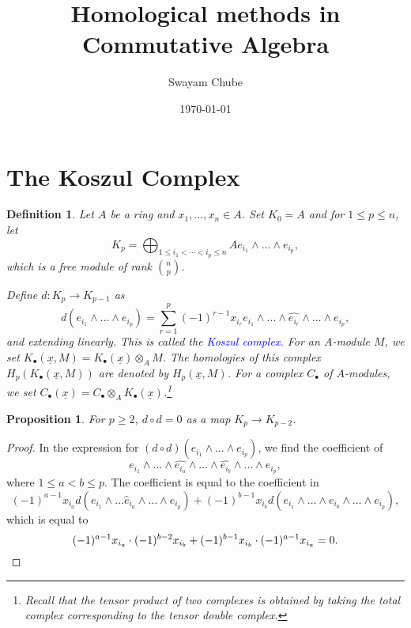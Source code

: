 \documentclass[12pt]{article}
\title{Homological methods in Commutative Algebra}
\author{Swayam Chube}
\date{\today}
\theoremstyle{thmstyle}
\newtheorem{proposition}[theorem]{Proposition}
\theoremstyle{defstyle}
\newtheorem{definition}[theorem]{Definition}
\newcommand{\wh}[1]{\widehat{#1}}
\newcommand{\define}[1]{\textcolor{blue}{\textit{#1}}}
\renewcommand{\le}{\leqslant}
\renewcommand{\ge}{\geqslant}
\begin{document}
\maketitle

\section{The Koszul Complex}

\begin{definition}
    Let $A$ be a ring and $x_1,\dots,x_n\in A$. Set $K_0 = A$ and for $1\le p\le n$, let 
    \begin{equation*}
        K_p = \bigoplus_{1\le i_1 < \cdots < i_p\le n} A e_{i_1}\wedge\dots\wedge e_{i_p},
    \end{equation*}
    which is a free module of rank $\binom{n}{p}$.

    Define $d: K_p\to K_{p - 1}$ as 
    \begin{equation*}
        d\left(e_{i_1}\wedge\dots\wedge e_{i_p}\right) = \sum_{r = 1}^p (-1)^{r - 1} x_{i_r} e_{i_1}\wedge\dots\wedge\wh{e_{i_r}}\wedge\dots\wedge e_{i_p},
    \end{equation*}
    and extending linearly. This is called the \define{Koszul complex}.  For an $A$-module $M$, we set $K_\bullet(\underline x, M) = K_\bullet(\underline x)\otimes_A M$. The homologies of this complex $H_p\left(K_\bullet(\underline x, M)\right)$ are denoted by $H_p(\underline x, M)$. For a complex $C_\bullet$ of $A$-modules, we set $C_\bullet(\underline x) = C_\bullet\otimes_A K_\bullet(\underline x)$.\footnote{Recall that the tensor product of two complexes is obtained by taking the total complex corresponding to the tensor double complex.} 
\end{definition}

\begin{proposition}
    For $p\ge 2$, $d\circ d = 0$ as a map $K_p\to K_{p - 2}$.
\end{proposition}
\begin{proof}
    In the expression for $(d\circ d)\left(e_{i_1}\wedge\dots\wedge e_{i_p}\right)$, we find the coefficient of 
    \begin{equation*}
        e_{i_1}\wedge\dots\wedge\wh{e_{i_a}}\wedge\dots\wedge\wh{e_{i_b}}\wedge\dots\wedge e_{i_p},
    \end{equation*}
    where $1\le a < b\le p$. The coefficient is equal to the coefficient in 
    \begin{equation*}
        (-1)^{a - 1}x_{i_a}d\left(e_{i_1}\wedge\dots\wh e_{i_a}\wedge\dots\wedge e_{i_p}\right) + (-1)^{b - 1} x_{i_b}d\left(e_{i_1}\wedge\dots\wedge e_{i_b}\wedge\dots\wedge e_{i_p}\right),
    \end{equation*}
    which is equal to 
    \begin{equation*}
        (-1)^{a - 1}x_{i_a}\cdot(-1)^{b - 2}x_{i_b} + (-1)^{b - 1}x_{i_b}\cdot(-1)^{a - 1}x_{i_a} = 0. \qedhere
    \end{equation*}
\end{proof}
\end{document}
